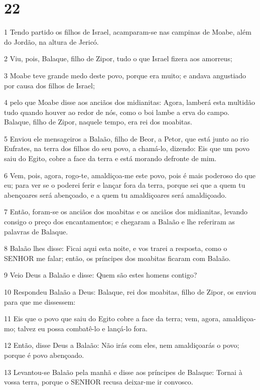 \chapter{22}

\par 1 Tendo partido os filhos de Israel, acamparam-se nas campinas de Moabe, além do Jordão, na altura de Jericó.
\par 2 Viu, pois, Balaque, filho de Zipor, tudo o que Israel fizera aos amorreus;
\par 3 Moabe teve grande medo deste povo, porque era muito; e andava angustiado por causa dos filhos de Israel;
\par 4 pelo que Moabe disse aos anciãos dos midianitas: Agora, lamberá esta multidão tudo quando houver ao redor de nós, como o boi lambe a erva do campo. Balaque, filho de Zipor, naquele tempo, era rei dos moabitas.
\par 5 Enviou ele mensageiros a Balaão, filho de Beor, a Petor, que está junto ao rio Eufrates, na terra dos filhos do seu povo, a chamá-lo, dizendo: Eis que um povo saiu do Egito, cobre a face da terra e está morando defronte de mim.
\par 6 Vem, pois, agora, rogo-te, amaldiçoa-me este povo, pois é mais poderoso do que eu; para ver se o poderei ferir e lançar fora da terra, porque sei que a quem tu abençoares será abençoado, e a quem tu amaldiçoares será amaldiçoado.
\par 7 Então, foram-se os anciãos dos moabitas e os anciãos dos midianitas, levando consigo o preço dos encantamentos; e chegaram a Balaão e lhe referiram as palavras de Balaque.
\par 8 Balaão lhes disse: Ficai aqui esta noite, e vos trarei a resposta, como o SENHOR me falar; então, os príncipes dos moabitas ficaram com Balaão.
\par 9 Veio Deus a Balaão e disse: Quem são estes homens contigo?
\par 10 Respondeu Balaão a Deus: Balaque, rei dos moabitas, filho de Zipor, os enviou para que me dissessem:
\par 11 Eis que o povo que saiu do Egito cobre a face da terra; vem, agora, amaldiçoa-mo; talvez eu possa combatê-lo e lançá-lo fora.
\par 12 Então, disse Deus a Balaão: Não irás com eles, nem amaldiçoarás o povo; porque é povo abençoado.
\par 13 Levantou-se Balaão pela manhã e disse aos príncipes de Balaque: Tornai à vossa terra, porque o SENHOR recusa deixar-me ir convosco.
